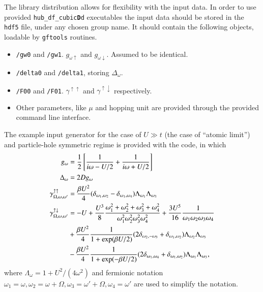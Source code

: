 \documentclass[3p,times,procedia]{elsarticle}
\begin{document}
The library distribution allows for flexibility with the input data. In order to use provided \texttt{hub\_df\_cubic{\bf D}d} executables the input data should be stored in the \texttt{hdf5} file, under any chosen group name. It should contain the following objects, loadable by \texttt{gftools} routines. 
\begin{itemize}
\item \texttt{/gw0} and \texttt{/gw1}. $g_{\omega \uparrow}$ and $g_{\omega \downarrow}$.  Assumed to be identical.
\item \texttt{/delta0} and \texttt{/delta1}, storing $\Delta_\omega$.
\item \texttt{/F00} and \texttt{/F01}. $\gamma^{\uparrow\uparrow}$ and $\gamma^{\uparrow\downarrow}$ respectively.
\item Other parameters, like $\mu$ and hopping unit are provided through the provided command line interface.
\end{itemize}
The example input generator for the case of $U \gg t$ (the case of  ``atomic limit'') and particle-hole symmetric regime is provided with the code, in which 
\begin{align}\label{eq:atomic_limit1}
g_{\omega} & = \frac{1}{2}\left[\frac{1}{i\omega - U/2} + \frac{1}{i\omega + U/2}\right] \\
\Delta_{\omega} & = 2Dg_{\omega} \label{eq:atomic_limit2} \\ 
\gamma^{\uparrow\uparrow}_{\Omega,\omega,\omega'} & = \frac{\beta U^2}{4} (\delta_{\omega_1,\omega_2} - \delta_{\omega_1,\omega_4} ) \Lambda_{\omega_1}\Lambda_{\omega_3} \label{eq:atomic_limit3} \\ 
\label{eq:atomic_limit4}
\gamma^{\uparrow\downarrow}_{\Omega,\omega,\omega'} & = -U + 
\frac{U^3}{8}\frac{\omega_1^2 + \omega_2^2 + \omega_3^2 + \omega_4^2}{\omega_1^2\omega_2^2\omega_3^2\omega_4^2} + \frac{3U^5}{16}\frac{1}{\omega_1\omega_2\omega_3\omega_4}  \\
& \notag + \frac{\beta U^2}{4} \frac{1}{1 + \exp(\beta U /2 )} 
(2\delta_{ \omega_2, -\omega_3} + \delta_{\omega_1, \omega_2}) 
\Lambda_{\omega_2} \Lambda_{\omega_3}  \\ 
& \notag - \frac{\beta U^2}{4} \frac{1}{1 + \exp(-\beta U /2 )} 
(2\delta_{ \omega_1, \omega_4} + \delta_{\omega_1, \omega_2}) 
\Lambda_{\omega_1} \Lambda_{\omega_3},
\end{align}
where $\Lambda_\omega = 1 + U^2/(4\omega^2)$ and fermionic notation $\omega_1 = \omega, \omega_2 = \omega + \Omega, \omega_3 = \omega' + \Omega, \omega_4 = \omega'$ are used to simplify the notation.
\end{document}
